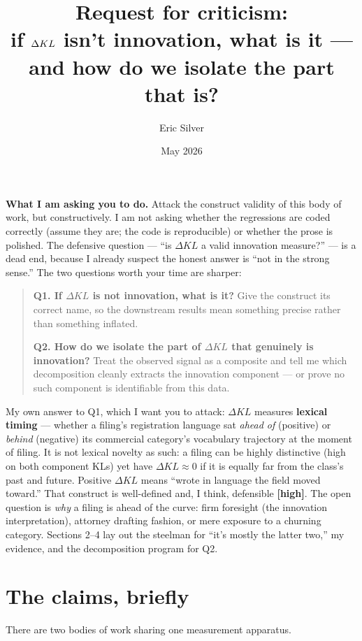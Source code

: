 \documentclass[11pt]{article}
\title{Request for criticism:\\
if $\dkl$ isn't innovation, what is it ---\\
and how do we isolate the part that is?}
\author{Eric Silver}
\affil{}
\date{May 2026}
\newcommand{\dkl}{\Delta KL}
\begin{document}
\maketitle

\noindent
\textbf{What I am asking you to do.} Attack the construct validity of
this body of work, but constructively. I am not asking whether the
regressions are coded correctly (assume they are; the code is
reproducible) or whether the prose is polished. The defensive
question --- ``is $\dkl$ a valid innovation measure?'' --- is a dead
end, because I already suspect the honest answer is ``not in the
strong sense.'' The two questions worth your time are sharper:

\begin{quote}
\textbf{Q1. If $\dkl$ is not innovation, what is it?} Give the
construct its correct name, so the downstream results mean something
precise rather than something inflated.

\textbf{Q2. How do we isolate the part of $\dkl$ that genuinely is
innovation?} Treat the observed signal as a composite and tell me
which decomposition cleanly extracts the innovation component ---
or prove no such component is identifiable from this data.
\end{quote}

My own answer to Q1, which I want you to attack: $\dkl$ measures
\textbf{lexical timing} --- whether a filing's registration language
sat \emph{ahead of} (positive) or \emph{behind} (negative) its
commercial category's vocabulary trajectory at the moment of filing.
It is not lexical novelty as such: a filing can be highly distinctive
(high on both component KLs) yet have $\dkl \approx 0$ if it is
equally far from the class's past and future. Positive $\dkl$ means
``wrote in language the field moved toward.'' That construct is
well-defined and, I think, defensible \textbf{[high]}. The open
question is \emph{why} a filing is ahead of the curve: firm
foresight (the innovation interpretation), attorney drafting fashion,
or mere exposure to a churning category. Sections 2--4 lay out the
steelman for ``it's mostly the latter two,'' my evidence, and the
decomposition program for Q2.

\section{The claims, briefly}

There are two bodies of work sharing one measurement apparatus.
\end{document}

